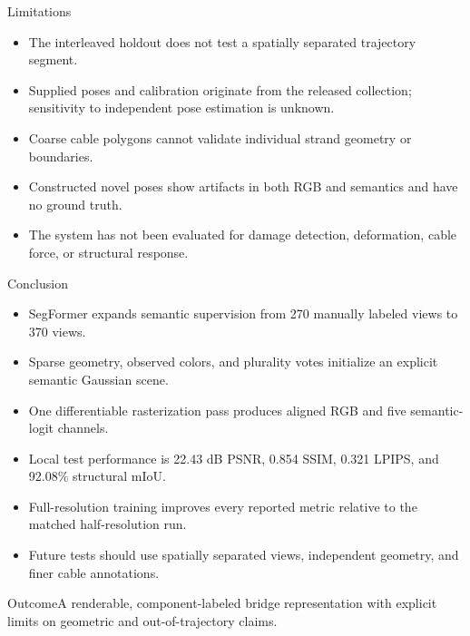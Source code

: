 \documentclass[aspectratio=169,10pt]{beamer}
\begin{document}
\begin{frame}{Limitations}
\begin{itemize}\tightitems
\item The interleaved holdout does not test a spatially separated trajectory segment.
\item Supplied poses and calibration originate from the released collection; sensitivity to independent pose estimation is unknown.
\item Coarse cable polygons cannot validate individual strand geometry or boundaries.
\item Constructed novel poses show artifacts in both RGB and semantics and have no ground truth.
\item The system has not been evaluated for damage detection, deformation, cable force, or structural response.
\end{itemize}
\end{frame}

\begin{frame}{Conclusion}
\begin{itemize}\tightitems
\item SegFormer expands semantic supervision from 270 manually labeled views to 370 views.
\item Sparse geometry, observed colors, and plurality votes initialize an explicit semantic Gaussian scene.
\item One differentiable rasterization pass produces aligned RGB and five semantic-logit channels.
\item Local test performance is 22.43 dB PSNR, 0.854 SSIM, 0.321 LPIPS, and 92.08\% structural mIoU.
\item Full-resolution training improves every reported metric relative to the matched half-resolution run.
\item Future tests should use spatially separated views, independent geometry, and finer cable annotations.
\end{itemize}
\begin{block}{Outcome}A renderable, component-labeled bridge representation with explicit limits on geometric and out-of-trajectory claims.\end{block}
\end{frame}
\end{document}
